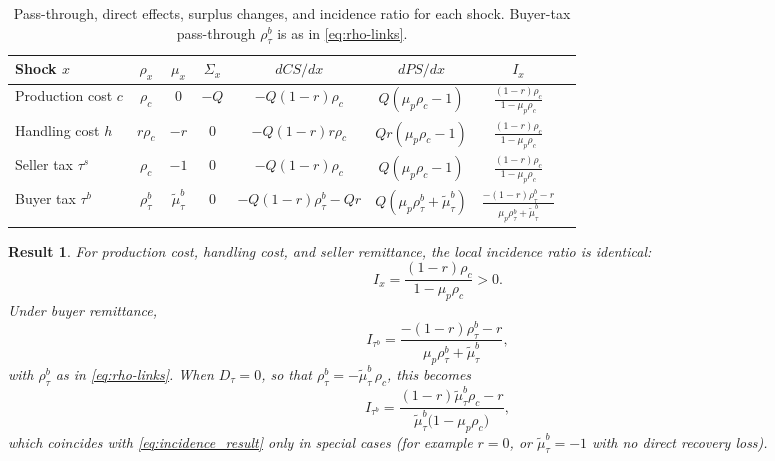 \documentclass[11pt]{article}
\newtheorem{result}{Result}
\begin{document}
\begin{table}[htbp]
\centering
\begin{tabular}{lccccccc}
\hline
Shock $x$ & $\rho_x$ & $\mu_x$ & $\Sigma_x$ & $dCS/dx$ & $dPS/dx$ & $I_x$ \\
\hline
Production cost $c$ & $\rho_c$ & $0$ & $-Q$ & $-Q(1-r)\rho_c$ & $Q(\mu_p\rho_c - 1)$ & $\displaystyle \frac{(1-r)\rho_c}{1-\mu_p\rho_c}$ \\
Handling cost $h$ & $r\rho_c$ & $-r$ & $0$ & $-Q(1-r)r\rho_c$ & $Qr(\mu_p\rho_c - 1)$ & $\displaystyle \frac{(1-r)\rho_c}{1-\mu_p\rho_c}$ \\
Seller tax $\tau^{s}$ & $\rho_c$ & $-1$ & $0$ & $-Q(1-r)\rho_c$ & $Q(\mu_p\rho_c - 1)$ & $\displaystyle \frac{(1-r)\rho_c}{1-\mu_p\rho_c}$ \\
Buyer tax $\tau^{b}$ & $\rho^{b}_{\tau}$ & $\tilde{\mu}^{b}_{\tau}$ & $0$ & $-Q(1-r)\rho^{b}_{\tau}-Qr$ & $Q(\mu_p\rho^{b}_{\tau}+\tilde{\mu}^{b}_{\tau})$ & $\displaystyle \frac{-(1-r)\rho^{b}_{\tau}-r}{\mu_p\rho^{b}_{\tau}+\tilde{\mu}^{b}_{\tau}}$ \\
\hline
\end{tabular}
\caption{Pass-through, direct effects, surplus changes, and incidence ratio for
each shock.  Buyer-tax pass-through $\rho^{b}_{\tau}$ is as in
\eqref{eq:rho-links}.}
\label{tab:incidence_components}
\end{table}

\begin{result}
\label{res:incidence-ratio}
For production cost, handling cost, and seller remittance, the local incidence
ratio is identical:
\begin{equation}
  I_x = \frac{(1-r)\rho_c}{1-\mu_p \rho_c}>0.
  \label{eq:incidence_result}
\end{equation}
Under buyer remittance,
\begin{equation}
  I_{\tau^{b}}
  =\frac{-(1-r)\rho^{b}_{\tau}-r}{\mu_p\rho^{b}_{\tau}+\tilde{\mu}^{b}_{\tau}},
\end{equation}
with $\rho^{b}_{\tau}$ as in \eqref{eq:rho-links}.  When $D_\tau=0$, so that
$\rho^{b}_{\tau}=-\tilde{\mu}^{b}_{\tau}\,\rho_c$, this becomes
\[
  I_{\tau^{b}}
  =\frac{(1-r)\tilde{\mu}^{b}_{\tau}\rho_c-r}{\tilde{\mu}^{b}_{\tau}\bigl(1-\mu_p\rho_c\bigr)},
\]
which coincides with \eqref{eq:incidence_result} only in special cases (for
example $r=0$, or $\tilde{\mu}^{b}_{\tau}=-1$ with no direct recovery loss).
\end{result}
\end{document}
